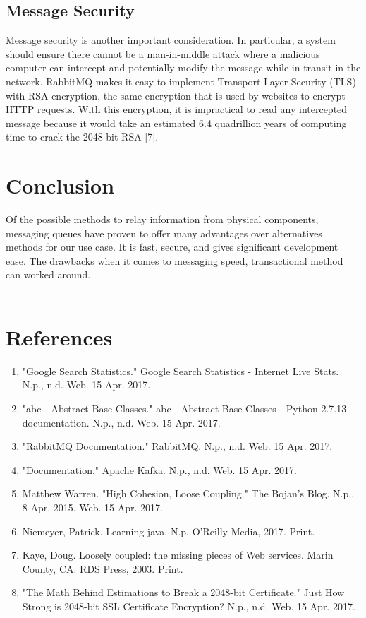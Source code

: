 \documentclass[12pt]{report}
\begin{document}
\subsection*{Message Security}
Message security is another important consideration. In particular, a system should ensure there cannot be a man-in-middle attack where a malicious computer can intercept and potentially modify the message while in transit in the network. RabbitMQ makes it easy to implement Transport Layer Security (TLS) with RSA encryption, the same encryption that is used by websites to encrypt HTTP requests. With this encryption, it is impractical to read any intercepted message because it would take an estimated 6.4 quadrillion years of computing time to crack the 2048 bit RSA [7].

\newpage\thispagestyle{fancy}\sectionfont{\scshape}
\section*{Conclusion}
\par\indent
Of the possible methods to relay information from physical components, messaging queues have proven to offer many advantages over alternatives methods for our use case. It is fast, secure, and gives significant development ease. The drawbacks when it comes to messaging speed, transactional method can worked around. \\ \\ \noindent

\newpage
\section*{References}

\begin{enumerate}
\item "Google Search Statistics." Google Search Statistics - Internet Live Stats. N.p., n.d. Web. 15 Apr. 2017.
\item "abc - Abstract Base Classes." abc - Abstract Base Classes - Python 2.7.13 documentation. N.p., n.d. Web. 15 Apr. 2017.
\item "RabbitMQ Documentation." RabbitMQ. N.p., n.d. Web. 15 Apr. 2017.
\item "Documentation." Apache Kafka. N.p., n.d. Web. 15 Apr. 2017.
\item Matthew Warren. "High Cohesion, Loose Coupling." The Bojan's Blog. N.p., 8 Apr. 2015. Web. 15 Apr. 2017.
\item Niemeyer, Patrick. Learning java. N.p. O'Reilly Media, 2017. Print.
\item Kaye, Doug. Loosely coupled: the missing pieces of Web services. Marin County, CA: RDS Press, 2003. Print.
\item "The Math Behind Estimations to Break a 2048-bit Certificate." Just How Strong is 2048-bit SSL Certificate Encryption? N.p., n.d. Web. 15 Apr. 2017.
\end{enumerate}
\end{document}
